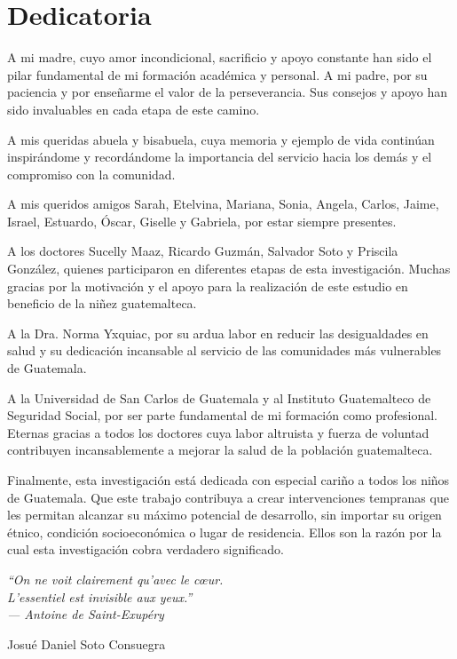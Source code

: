 \chapter*{Dedicatoria}
A mi madre, cuyo amor incondicional, sacrificio y apoyo constante han sido el 
pilar fundamental de mi formación académica y personal. A mi padre, por su 
paciencia y por enseñarme el valor de la perseverancia. Sus consejos y apoyo 
han sido invaluables en cada etapa de este camino.

A mis queridas abuela y bisabuela, cuya memoria y ejemplo de vida continúan 
inspirándome y recordándome la importancia del servicio hacia los demás y el 
compromiso con la comunidad.

A mis queridos amigos Sarah, Etelvina, Mariana, Sonia, Angela, Carlos, Jaime, 
Israel, Estuardo, Óscar, Giselle y Gabriela, por estar siempre presentes.

A los doctores Sucelly Maaz, Ricardo Guzmán, Salvador Soto y Priscila González, 
quienes participaron en diferentes etapas de esta investigación. Muchas gracias 
por la motivación y el apoyo para la realización de este estudio en beneficio 
de la niñez guatemalteca.

A la Dra. Norma Yxquiac, por su ardua labor en reducir las desigualdades en 
salud y su dedicación incansable al servicio de las comunidades más vulnerables 
de Guatemala.

A la Universidad de San Carlos de Guatemala y al Instituto Guatemalteco de 
Seguridad Social, por ser parte fundamental de mi formación como profesional. 
Eternas gracias a todos los doctores cuya labor altruista y fuerza de voluntad 
contribuyen incansablemente a mejorar la salud de la población guatemalteca.

Finalmente, esta investigación está dedicada con especial cariño a todos los 
niños de Guatemala. Que este trabajo contribuya a crear intervenciones tempranas 
que les permitan alcanzar su máximo potencial de desarrollo, sin importar su 
origen étnico, condición socioeconómica o lugar de residencia. Ellos son la 
razón por la cual esta investigación cobra verdadero significado.

\vspace{1cm}

\begin{center}
\textit{``On ne voit clairement qu'avec le cœur. \\
L'essentiel est invisible aux yeux.''} \\
\textit{--- Antoine de Saint-Exupéry}
\end{center}

\vspace{1cm}

\begin{flushright}
Josué Daniel Soto Consuegra
\end{flushright}
